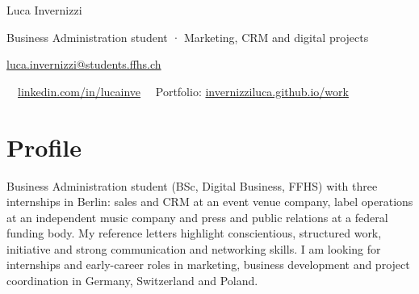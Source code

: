 \documentclass[10pt,a4paper]{article}
\newif\ifshowphone
\newcommand{\phone}{+41 78 945 80 35}
\newif\ifshowcitizenship
\newcommand{\semibold}{\fontseries{sb}\selectfont}
\begin{document}
\small\raggedright

{\displayfont\fontsize{24}{27}\selectfont Luca Invernizzi}\par\vspace{3pt}
{\semibold\fontsize{10}{12}\selectfont\color{accent} Business Administration student · Marketing, CRM and digital projects}\par\vspace{5pt}
{\footnotesize\color{ink2}
\href{mailto:luca.invernizzi@students.ffhs.ch}{luca.invernizzi@students.ffhs.ch}
\ifshowphone\ \textbar\ \phone\fi
\ \textbar\ \href{https://www.linkedin.com/in/lucainve/}{linkedin.com/in/lucainve}
\ \textbar\ Portfolio: \href{https://invernizziluca.github.io/work/}{invernizziluca.github.io/work}
\ifshowcitizenship\ \textbar\ Swiss citizen\fi}

\section*{Profile}
Business Administration student (BSc, Digital Business, FFHS) with three internships in Berlin: sales and CRM at an event venue company, label operations at an independent music company and press and public relations at a federal funding body.
My reference letters highlight conscientious, structured work, initiative and strong communication and networking skills.
I am looking for internships and early-career roles in marketing, business development and project coordination in Germany, Switzerland and Poland.
\end{document}
